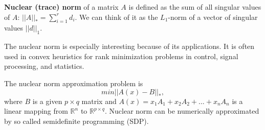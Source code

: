 \documentclass[a4paper,10pt]{article}
\begin{document}
\textbf{Nuclear (trace) norm} of a matrix $A$ is defined as the sum of all singular values of $A$: $||A||_*=\sum_{i=1}^rd_{i}$.  We can think of it as the $L_1$-norm of a vector of singular values $||d||_1$. \cite{lyche}

The nuclear norm is especially interesting because of its applications.
It is often used in convex heuristics for rank minimization problems in control, signal processing, and statistics. \cite{seas}

The nuclear norm approximation problem is $$min||A(x)-B||_*,$$ where $B$ is a given $p\times q$ matrix and $A(x)=x_1A_1+x_2A_2+...+x_nA_n$ is a linear mapping from $\mathbb{R}^n$ to $\mathbb{R}^{p\times q}$.
Nuclear norm can be numerically approximated by so called semidefinite programming (SDP). \cite{seas}
\end{document}
